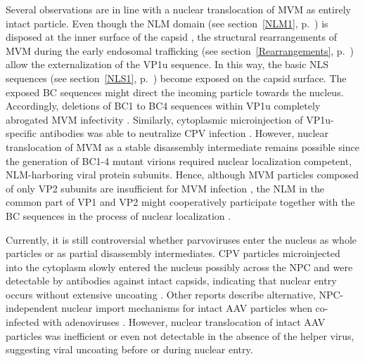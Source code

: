 Several observations are in line with a nuclear translocation of MVM as entirely intact particle. Even though the NLM domain (see section~\ref{NLM1}, p.~\pageref{NLM1}) is disposed at the inner surface of the capsid \cite{pmid9817841}, the structural rearrangements of MVM during the early endosomal trafficking (see section~\ref{Rearrangements}, p.~\pageref{Rearrangements}) allow the externalization of the VP1u sequence. In this way, the basic NLS sequences (see section~\ref{NLS1}, p.~\pageref{NLS1}) become exposed on the capsid surface. The exposed BC sequences might direct the incoming particle towards the nucleus. Accordingly, deletions of BC1 to BC4 sequences within VP1u completely abrogated MVM infectivity \cite{pmid12072505}. Similarly, cytoplasmic microinjection of VP1u-specific antibodies was able to neutralize CPV infection \cite{pmid11799183}. However, nuclear translocation of MVM as a stable disassembly intermediate remains possible since the generation of BC1-4 mutant virions required nuclear localization competent, NLM-harboring viral protein subunits. Hence, although MVM particles composed of only VP2 subunits are insufficient for MVM infection \cite{pmid8416366}, the NLM in the common part of VP1 and VP2 might cooperatively participate together with the BC sequences in the process of nuclear localization \cite{pmid12072505}.

Currently, it is still controversial whether parvoviruses enter the nucleus as whole particles or as partial disassembly intermediates. CPV particles microinjected into the cytoplasm slowly entered the nucleus possibly across the NPC and were detectable by antibodies against intact capsids, indicating that nuclear entry occurs without extensive uncoating \cite{pmid12970411, pmid10775624}. Other reports describe alternative, NPC-independent nuclear import mechanisms for intact AAV particles when co-infected with adenoviruses \cite{pmid11592830, pmid12388712}. However, nuclear translocation of intact AAV particles was inefficient \cite{pmid16140755, pmid10684294, pmid11729319} or even not detectable \cite{pmid16956943} in the absence of the helper virus, suggesting viral uncoating before or during nuclear entry.

